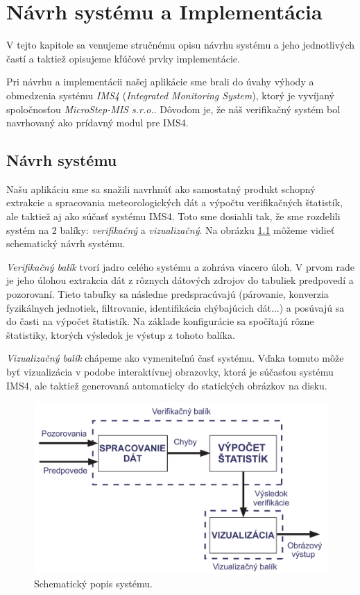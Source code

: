 \chapter{Návrh systému a Implementácia}
V tejto kapitole sa venujeme stručnému opisu návrhu systému a jeho jednotlivých častí a taktiež opisujeme kľúčové prvky implementácie.

Pri návrhu a implementácii našej aplikácie sme brali do úvahy výhody a obmedzenia systému \textit{IMS4} (\textit{Integrated Monitoring System}), ktorý je vyvíjaný spoločnosťou \textit{MicroStep-MIS s.r.o.}. Dôvodom je, že náš verifikačný systém bol navrhovaný ako prídavný modul pre IMS4.

\section{Návrh systému}
\label{sec:sysdesign}
Našu aplikáciu sme sa snažili navrhnúť ako samostatný produkt schopný extrakcie a spracovania meteorologických dát a výpočtu verifikačných štatistík, ale taktiež aj ako súčasť systému IMS4. Toto sme dosiahli tak, že sme rozdelili systém na 2 balíky: \textit{verifikačný} a \textit{vizualizačný}. Na obrázku \ref{fig:system} môžeme vidieť schematický návrh systému.

\textit{Verifikačný balík} tvorí jadro celého systému a zohráva viacero úloh. V prvom rade je jeho úlohou extrakcia dát z rôznych dátových zdrojov do tabuliek predpovedí a pozorovaní. Tieto tabuľky sa následne predspracúvajú (párovanie, konverzia fyzikálnych jednotiek, filtrovanie, identifikácia chýbajúcich dát...) a posúvajú sa do časti na výpočet štatistík. Na základe konfigurácie sa spočítajú rôzne štatistiky, ktorých výsledok je výstup z tohoto balíka.

\textit{Vizualizačný balík} chápeme ako vymeniteľnú časť systému. Vďaka tomuto môže byť vizualizácia v podobe interaktívnej obrazovky, ktorá je súčasťou systému IMS4, ale taktiež generovaná automaticky do statických obrázkov na disku.

\begin{figure}
	\centering
	\includegraphics[width = 5in]{system}
	\caption{Schematický popis systému.}
	\label{fig:system} 
\end{figure}

